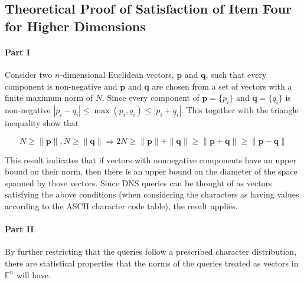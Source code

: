 \documentclass[12pt]{report}
\theoremstyle{remark}
\theoremstyle{definition}
\theoremstyle{definition}
\theoremstyle{definition}
\begin{document}

\subsection{Theoretical Proof of Satisfaction of Item Four for Higher Dimensions}
\label{item-four-theory}

\paragraph{Part I} Consider two $n$-dimensional Euclidean vectors, $\mathbf p$ and $\mathbf q$,
such that every component is non-negative and $\mathbf p$ and $\mathbf q$ are
chosen from a set of vectors with a finite maximum norm of $N$. Since every
component of $\mathbf p=\{p_i\}$ and $\mathbf q=\{q_i\}$ is non-negative
$|p_i-q_i|\leq\max{(p_i,q_i)}\leq|p_i+q_i|$. This together with the triangle
inequality show that

\begin{equation}
N\geq\|\mathbf p\|,N\geq\|\mathbf q\|\Rightarrow 2N\geq\|\mathbf p\|+\|\mathbf
q\|\geq\|\mathbf p+\mathbf q\|\geq\|\mathbf p-\mathbf q\|
\end{equation}

This result indicates that if vectors with nonnegative components have an upper
bound on their norm, then there is an upper bound on the diameter of the space
spanned by those vectors. Since DNS queries can be thought of as vectors
satisfying the above conditions (when considering the characters as having values
according to the ASCII character code table\cite{asciitable}), the result
applies.

\paragraph{Part II} By further restricting that the queries follow a prescribed
character distribution, there are statistical properties that the norms of the
queries treated as vectors in $\mathbb E^n$ will have.
\end{document}
